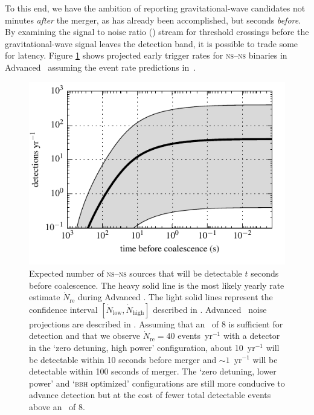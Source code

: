 To this end, we have the ambition of reporting gravitational-wave candidates
not minutes \emph{after} the merger, as has already been accomplished, but
seconds \emph{before}.  By examining the signal to noise ratio (\SNR{}) stream
for threshold crossings before the gravitational-wave signal leaves the
detection band, it is possible to trade some \SNR{}
for latency.  Figure \ref{fig:earlywarning} shows projected early trigger rates
for \textsc{ns}--\textsc{ns} binaries in Advanced \LIGO\ assuming the event rate predictions
in~\cite{Abadie:2010p10836}.
%
\begin{figure}
\begin{center}
\includegraphics{figures/snr_in_time.pdf}
\caption{\label{fig:earlywarning} Expected number of \textsc{ns}--\textsc{ns} sources that will
be detectable $t$ seconds before coalescence.  The heavy solid line is the most
likely yearly rate estimate $\dot N_{\mathrm{re}}$ during Advanced \LIGO.  The
light solid lines represent the confidence interval $[\dot N_{\mathrm{low}}, \dot 
N_{\mathrm{high}}]$ described in
\cite{Abadie:2010p10836}.  Advanced \LIGO\ noise projections are described in 
\cite{ALIGONoise}.  Assuming that an \SNR\ of 8 is sufficient for
detection and that we observe $\dot N_{\mathrm{re}} = 40$ events~yr$^{-1}$ with a
detector in the `zero detuning, high power' configuration, about 10~yr$^{-1}$ will be 
detectable within 10 seconds before merger and $\sim1$~yr$^{-1}$ will be detectable 
within 100 seconds of merger.  The `zero detuning, lower power' and `\textsc{bbh} optimized' configurations are still more conducive to advance detection
but at the cost of fewer total detectable events above an \SNR\ of 8.}
\end{center}
\end{figure}

